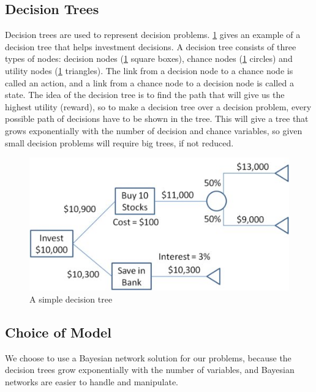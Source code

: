 \subsection{Decision Trees}
Decision trees are used to represent decision problems. \ref{fig:basicdecisiontree} gives an example of a decision tree that helps investment decisions. A decision tree consists of three types of nodes: decision nodes (\ref{fig:basicdecisiontree} square boxes), chance nodes (\ref{fig:basicdecisiontree} circles) and utility nodes (\ref{fig:basicdecisiontree} triangles). The link from a decision node to a chance node is called an action, and a link from a chance node to a decision node is called a state. The idea of the decision tree is to find the path that will give us the highest utility (reward), so to make a decision tree over a decision problem, every possible path of decisions have to be shown in the tree. This will give a tree that grows exponentially with the number of decision and chance variables, so given small decision problems will require big trees, if not reduced. 
	
\begin{figure}[H]
\includegraphics[scale=.8]{Figures/BayesianPictures/SimpleDecisionTree.png}
\caption{A simple decision tree \cite{sdt}}
\label{fig:basicdecisiontree}
\end{figure}

\subsection{Choice of Model}
We choose to use a Bayesian network solution for our problems, because the decision trees grow exponentially with the number of variables, and 
Bayesian networks are easier to handle and manipulate.
